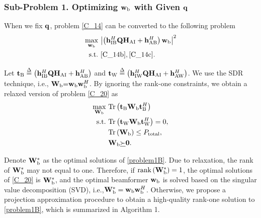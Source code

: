 \documentclass[10pt,journal,letterpaper,twocolumn,twoside]{IEEEtran} %
\begin{document}
  \subsubsection{{{Sub-Problem 1. Optimizing ${{\mathbf{w}}_{\rm{b}}}$ with Given ${\bf{q}}$}}}

When we fix ${\bf{q}}$, problem \eqref{C_14} can be converted to the following problem
\begin{align}\label{C_20}
 \mathop {\max }\limits_{{{\mathbf{w}}_{\rm{b}}}} ~&{\left| {\left( {{\bf{h}}_{{\rm{IB}}}^H{\bf{Q}}{{\bf{H}}_{{\rm{AI}}}} + {\bf{h}}_{{\rm{AB}}}^H} \right){{\bf{w}}_{\rm{b}}}} \right|^2}\\
 {\rm{s.t.}}~&\eqref{C_14b},\eqref{C_14c}\notag.
 \end{align}


Let ${{\bf{t}}_{\rm{B}}} \buildrel \Delta \over = {\left( {{\bf{h}}_{{\rm{IB}}}^H{\bf{Q}}{{\bf{H}}_{{\rm{AI}}}} + {\bf{h}}_{{\rm{AB}}}^H} \right)}$ and ${{\bf{t}}_{\rm{W}}} \buildrel \Delta \over = \left( {{\bf{h}}_{{\rm{IW}}}^H{\bf{Q}}{{\bf{H}}_{{\rm{AI}}}} + {\bf{h}}_{{\rm{AW}}}^H} \right)$.
We  use the SDR technique, i.e., ${{\bf{W}}_{\rm{b}}}{\rm{ = }}{{\bf{w}}_{\rm{b}}}{\bf{w}}_{\rm{b}}^H$. By ignoring the rank-one constraints,  we obtain a relaxed version of problem \eqref{C_20}   as
    \begin{subequations}\label{problem1B}
\begin{align}
 \mathop {\max }\limits_{{{\bf{W}}_{\rm{b}}}} ~&{\rm{Tr}}\left( {{\bf{t}}_{\rm{B}}{{\bf{W}}_{\rm{b}}}{{\bf{t}}_{\rm{B}}^H}} \right) \\
 {\rm{s.t.}}~&{\rm{Tr}}\left( {{\bf{t}}_{\rm{W}}{{\bf{W}}_{\rm{b}}}{{\bf{t}}_{\rm{W}}^H}} \right)=0,\label{problem1Bb}\\
 & {\rm{Tr}}\left( {{{\bf{W}}_{\rm{b}}}} \right) \le {P_{{\rm{total}}}},\label{problem1c}\\
 &{{{\bf{W}}_{\rm{b}}}} \underline  \succ  {\bf{0}}.\label{problem1Bd}
 \end{align}
\end{subequations}

Denote ${\bf{W}}_{{\rm{b}}}^*$  as the optimal solutions of \eqref{problem1B}.
Due to relaxation, the rank of  ${\bf{W}}_{{\rm{b}}}^*$  may not equal to one.
Therefore, if ${\rm{rank}}\left( {{\bf{W}}_{{\rm{b}}}^*} \right) = 1$,  the optimal solutions of \eqref{C_20} is ${\bf{W}}_{{\rm{b}}}^*$, and the optimal beamformer  ${{\bf{w}}_{{\rm{b}}}}$   is solved based on the singular value decomposition (SVD), i.e.,${\bf{W}}_{{\rm{b}}}^* = {{\bf{w}}_{{\rm{b}}}}{\bf{w}}_{{\rm{b}}}^H$.
Otherwise,
we propose a  projection approximation
procedure  to obtain a high-quality rank-one solution to \eqref{problem1B}, which is summarized in Algorithm 1.
\end{document}
